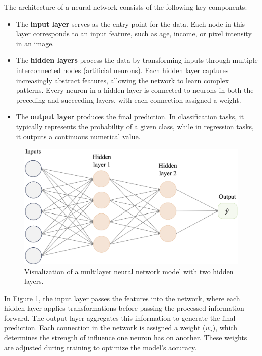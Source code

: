 \documentclass[
  11pt,
]{book}
\theoremstyle{definition}
\theoremstyle{definition}
\theoremstyle{definition}
\theoremstyle{definition}
\theoremstyle{remark}
\begin{document}
The architecture of a neural network consists of the following key components:

\begin{itemize}
\item
  The \textbf{input layer} serves as the entry point for the data. Each node in this layer corresponds to an input feature, such as age, income, or pixel intensity in an image.
\item
  The \textbf{hidden layers} process the data by transforming inputs through multiple interconnected nodes (artificial neurons). Each hidden layer captures increasingly abstract features, allowing the network to learn complex patterns. Every neuron in a hidden layer is connected to neurons in both the preceding and succeeding layers, with each connection assigned a weight.
\item
  The \textbf{output layer} produces the final prediction. In classification tasks, it typically represents the probability of a given class, while in regression tasks, it outputs a continuous numerical value.
\end{itemize}

\begin{figure}[H]

{\centering \includegraphics[width=0.8\linewidth]{images/ch12_net_large} 

}

\caption{Visualization of a multilayer neural network model with two hidden layers.}\label{fig:net-large}
\end{figure}

In Figure \ref{fig:net-large}, the input layer passes the features into the network, where each hidden layer applies transformations before passing the processed information forward. The output layer aggregates this information to generate the final prediction. Each connection in the network is assigned a weight (\(w_i\)), which determines the strength of influence one neuron has on another. These weights are adjusted during training to optimize the model's accuracy.
\end{document}
